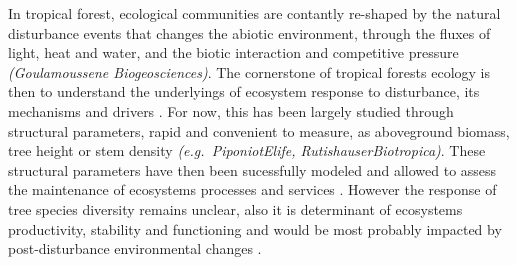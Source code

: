 \documentclass[fleqn,10pt]{ArtEcoFoG} %
\theoremstyle{definition}
\theoremstyle{definition}
\theoremstyle{definition}
\theoremstyle{remark}
\begin{document}
In tropical forest, ecological communities are contantly re-shaped by
the natural disturbance events that changes the abiotic environment,
through the fluxes of light, heat and water, and the biotic interaction
and competitive pressure \emph{(Goulamoussene Biogeosciences)}. The
cornerstone of tropical forests ecology is then to understand the
underlyings of ecosystem response to disturbance, its mechanisms and
drivers \citep{White2001, Chazdon2003a}. For now, this has been largely
studied through structural parameters, rapid and convenient to measure,
as aboveground biomass, tree height or stem density
\emph{(e.g.~PiponiotElife, RutishauserBiotropica)}. These structural
parameters have then been sucessfully modeled and allowed to assess the
maintenance of ecosystems processes and services
\citep{Denslow2000, Blanc2009, Rutishauser2016}. However the response of
tree species diversity remains unclear, also it is determinant of
ecosystems productivity, stability and functioning
\citep[Liang2016Science]{Tilman2014} and would be most probably impacted
by post-disturbance environmental changes \citep{BaralotoJAE}.
\end{document}
